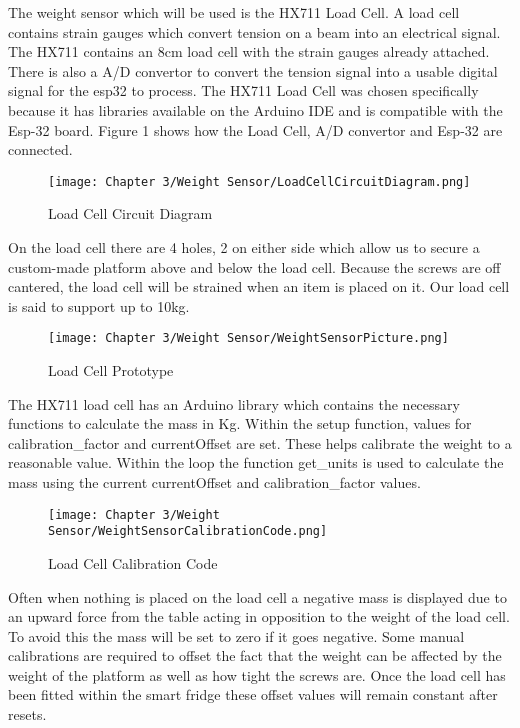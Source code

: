 The weight sensor which will be used is the HX711 Load Cell.
A load cell contains strain gauges which convert tension on a beam into an electrical signal.
The HX711 contains an 8cm load cell with the strain gauges already attached.
There is also a A/D convertor to convert the tension signal into a usable digital signal for the esp32 to process.
The HX711 Load Cell was chosen specifically because it has libraries available on the Arduino IDE and is compatible with the Esp-32 board.
Figure 1 shows how the Load Cell, A/D convertor and Esp-32 are connected.

\begin{figure}[H]        
    \centering
    \texttt{[image: Chapter 3/Weight Sensor/LoadCellCircuitDiagram.png]}
    \caption{Load Cell Circuit Diagram}
    \label{fig:lccircuit}
\end{figure} 

On the load cell there are 4 holes, 2 on either side which allow us to secure a custom-made platform above and below the load cell.
Because the screws are off cantered, the load cell will be strained when an item is placed on it.
Our load cell is said to support up to 10kg.

\begin{figure}[H]        
    \centering
    \texttt{[image: Chapter 3/Weight Sensor/WeightSensorPicture.png]}
    \caption{Load Cell Prototype}
    \label{fig:lcproto}
\end{figure} 

The HX711 load cell has an Arduino library which contains the necessary functions to calculate the mass in Kg.
Within the setup function, values for calibration\_factor and currentOffset are set.
These helps calibrate the weight to a reasonable value.
Within the loop the function get\_units is used to calculate the mass using the current currentOffset and calibration\_factor values.

\begin{figure}[H]        
    \centering
    \texttt{[image: Chapter 3/Weight Sensor/WeightSensorCalibrationCode.png]}
    \caption{Load Cell Calibration Code}
    \label{fig:lccode}
\end{figure} 

Often when nothing is placed on the load cell a negative mass is displayed due to an upward force from the table acting in opposition to the weight of the load cell.
To avoid this the mass will be set to zero if it goes negative.
Some manual calibrations are required to offset the fact that the weight can be affected by the weight of the platform as well as how tight the screws are.
Once the load cell has been fitted within the smart fridge these offset values will remain constant after resets.

